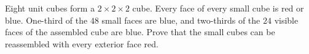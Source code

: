 Eight unit cubes form a $2\times2\times2$ cube. Every face of every small cube is red or blue. One-third of the $48$ small faces are blue, and two-thirds of the $24$ visible faces of the assembled cube are blue. Prove that the small cubes can be reassembled with every exterior face red.
